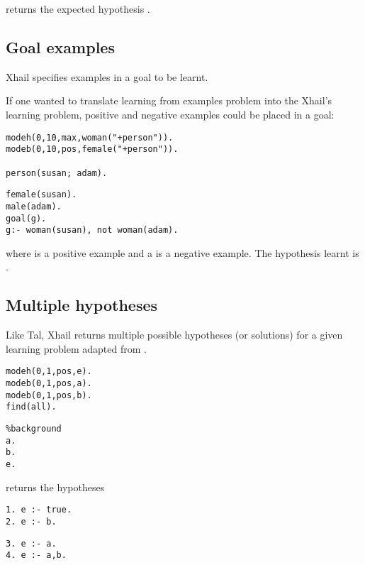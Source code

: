 returns the expected hypothesis .

\subsection{Goal examples}
Xhail specifies examples in a goal to be learnt.

If one wanted to translate learning from examples problem into the Xhail's learning problem, positive and negative examples could be placed in a goal:

\begin{minipage}[t]{.50\textwidth}
\begin{lstlisting}
modeh(0,10,max,woman("+person")).
modeb(0,10,pos,female("+person")).

person(susan; adam).
\end{lstlisting}
\end{minipage}
\begin{minipage}[t]{.20\textwidth}
\begin{lstlisting}
female(susan).
male(adam).
goal(g).
g:- woman(susan), not woman(adam).
\end{lstlisting}
\end{minipage}

where  is a positive example and a  is a negative example. The hypothesis learnt is
.

\subsection{Multiple hypotheses}
Like Tal, Xhail returns multiple possible hypotheses (or solutions) for a given learning problem adapted from \cite{ray2007xhail}.

\begin{minipage}[t]{.50\textwidth}
\begin{lstlisting}
modeh(0,1,pos,e).
modeb(0,1,pos,a).
modeb(0,1,pos,b).
find(all).
\end{lstlisting}
\end{minipage}
\begin{minipage}[t]{.20\textwidth}
\begin{lstlisting}
%background
a.
b.
e.
\end{lstlisting}
\end{minipage}

returns the hypotheses

\begin{minipage}[t]{.25\textwidth}
\begin{lstlisting}
1. e :- true.
2. e :- b.
\end{lstlisting}
\end{minipage}
\begin{minipage}[t]{.20\textwidth}
\begin{lstlisting}
3. e :- a.
4. e :- a,b.
\end{lstlisting}
\end{minipage}

